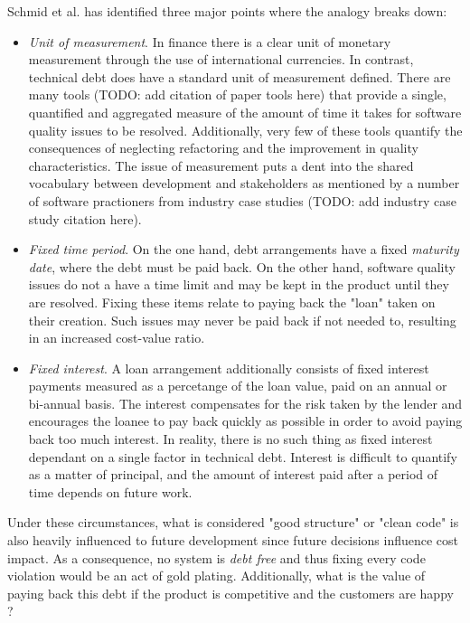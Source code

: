 \documentclass{mprop}
\begin{document}
Schmid et al. \cite{Schmid2013} has identified three major points where the
analogy breaks down:
\begin{itemize}
	\item \textit{Unit of measurement}. In finance there is a clear unit of
	      monetary measurement through the use of international currencies. In
	      contrast, technical debt does have a standard unit of measurement
	      defined. There are many tools (TODO: add citation of paper tools
	      here) that provide a single, quantified and aggregated measure of
	      the amount of time it takes for software quality issues to be
	      resolved. Additionally, very few of these tools quantify the
	      consequences of neglecting refactoring and the improvement in
	      quality characteristics. The issue of measurement puts a dent into
	      the shared vocabulary between development and stakeholders as
	      mentioned by a number of software practioners from industry case
	      studies (TODO: add industry case study citation here).
	\item \textit{Fixed time period}. On the one hand, debt arrangements have
	      a fixed \textit{maturity date}, where the debt must be paid back. On
	      the other hand, software quality issues do not a have a time limit
	      and may be kept in the product until they are resolved. Fixing these
	      items relate to paying back the "loan" taken on their creation. Such
	      issues may never be paid back if not needed to, resulting in an
	      increased cost-value ratio.
	\item \textit{Fixed interest}. A loan arrangement additionally consists of
	      fixed interest payments measured as a percetange of the loan value,
	      paid on an annual or bi-annual basis. The interest compensates for
	      the risk taken by the lender and encourages the loanee to pay back
	      quickly as possible in order to avoid paying back too much interest.
	      In reality, there is no such thing as fixed interest dependant on a
	      single factor in technical debt. Interest is difficult to quantify
	      as a matter of principal, and the amount of interest paid after a
	      period of time depends on future work.
\end{itemize}
Under these circumstances, what is considered "good structure" or "clean code"
is also heavily influenced to future development since future decisions
influence cost impact. As a consequence, no system is \textit{debt free} and
thus fixing every code violation would be an act of gold plating. Additionally,
what is the value of paying back this debt if the product is competitive and the
customers are happy \cite{Lim2012}?
\end{document}
